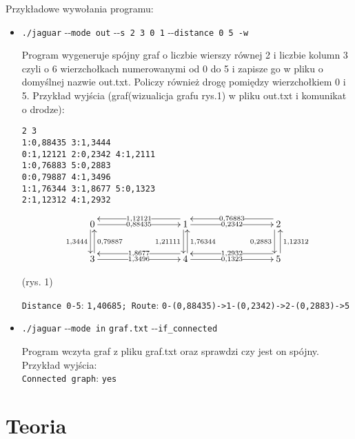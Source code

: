 \documentclass[]{article}
\begin{document}
Przykładowe wywołania programu:

\begin{itemize}
\item
\verb|./jaguar| -\/-\verb|mode out| -\/-\verb|s 2 3 0 1| -\/-\verb|distance 0 5 -w|

Program wygeneruje spójny graf o liczbie wierszy równej 2 i liczbie kolumn 3 czyli o 6 wierzchołkach numerowanymi od 0 do 5 i zapisze go w pliku o domyślnej nazwie out.txt. Policzy również drogę pomiędzy wierzchołkiem 0 i 5. Przykład wyjścia (graf(wizualicja grafu rys.1) w pliku out.txt i komunikat o drodze):

\texttt{2 3\\
 1:0,88435 3:1,3444\\
0:1,12121 2:0,2342 4:1,2111\\
1:0,76883 5:0,2883\\
0:0,79887 4:1,3496\\
1:1,76344 3:1,8677 5:0,1323\\
2:1,12312 4:1,2932}

\begin{equation*}
\xymatrix@C=3cm{
  0 \ar[r]|{0,88435} \ar@<-2pt>[d]_{1,3444} & 1 \ar@<-2pt>[d]_{1,21111} \ar[r]|{0,2342}\ar@<-6pt>[l]|{1,12121} & 2 \ar@<-4pt>[d]_{0,2883}\ar@<-6pt>[l]|{0,76883}\\
   3\ar@<-2pt>[u]_{0,79887} \ar[r]|{1,3496}   & 4 \ar@<-2pt>[u]_{1,76344} \ar@<-0pt>[r]|{0,1323} \ar@<-6pt>[l]|{1,8677} & 5 \ar@<-6pt>[l]|{1,2932} \ar@<-2pt>[u]_{1,12312}
}
\end{equation*}
\begin{center}
(rys. 1)
\end{center}

 
\texttt{Distance 0-5}: \texttt{1,40685; Route}: \texttt{0-(0,88435)->1-(0,2342)->2-(0,2883)->5}
\item
\verb|./jaguar| -\/-\verb|mode in| \verb|graf.txt| -\/-\verb|if_connected|

Program wczyta graf z pliku graf.txt oraz sprawdzi czy jest on spójny. Przykład wyjścia:\\
\texttt{Connected graph}: \texttt{yes} 



\end{itemize}

\section{Teoria}\label{header-n279}
\end{document}
